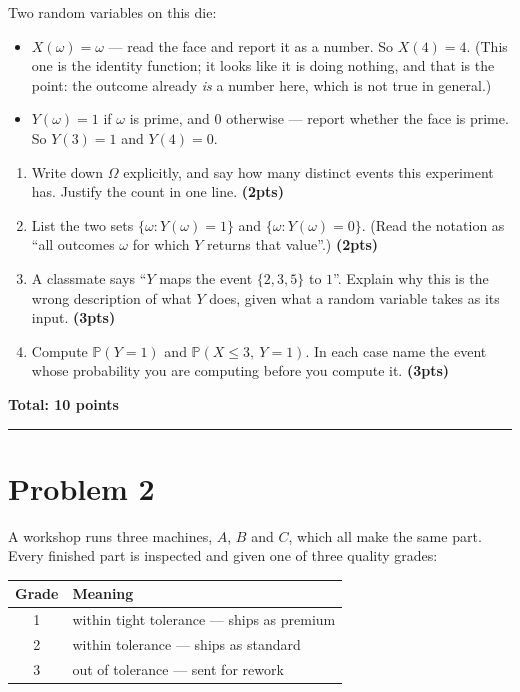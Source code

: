 \documentclass[11pt,a4paper]{article}
\newcommand{\pts}[1]{\hfill\textbf{(#1pts)}}
\newcommand{\total}[1]{\par\medskip\noindent\textbf{Total: #1 points}}
\newcommand{\PP}{\mathbb{P}}
\newenvironment{parts}
  {\begin{enumerate}\setlength{\itemsep}{0.45em}\setlength{\parskip}{0pt}}
  {\end{enumerate}}
\begin{document}
\noindent
Two random variables on this die:

\begin{itemize}\setlength{\itemsep}{0.4em}
  \item $X(\omega) = \omega$ — read the face and report it as a number. So
        $X(4) = 4$. (This one is the identity function; it looks like it is doing
        nothing, and that is the point: the outcome already \emph{is} a number
        here, which is not true in general.)
  \item $Y(\omega) = 1$ if $\omega$ is prime, and $0$ otherwise — report whether
        the face is prime. So $Y(3) = 1$ and $Y(4) = 0$.
\end{itemize}

\begin{parts}
  \item Write down $\Omega$ explicitly, and say how many distinct events this
        experiment has. Justify the count in one line. \pts{2}
  \item List the two sets $\{\omega : Y(\omega) = 1\}$ and
        $\{\omega : Y(\omega) = 0\}$. (Read the notation as ``all outcomes
        $\omega$ for which $Y$ returns that value''.) \pts{2}
  \item A classmate says ``$Y$ maps the event $\{2,3,5\}$ to $1$''. Explain why
        this is the wrong description of what $Y$ does, given what a random
        variable takes as its input. \pts{3}
  \item Compute $\PP(Y = 1)$ and $\PP(X \le 3,\ Y = 1)$. In each case name the
        event whose probability you are computing before you compute it. \pts{3}
\end{parts}

\total{10}

\bigskip
\hrule
\bigskip

\section*{Problem 2}

A workshop runs three machines, $A$, $B$ and $C$, which all make the same part.
Every finished part is inspected and given one of three quality grades:

\begin{center}
\begin{tabular}{cl}
\toprule
Grade & Meaning \\
\midrule
1 & within tight tolerance — ships as premium \\
2 & within tolerance — ships as standard \\
3 & out of tolerance — sent for rework \\
\bottomrule
\end{tabular}
\end{center}
\end{document}
